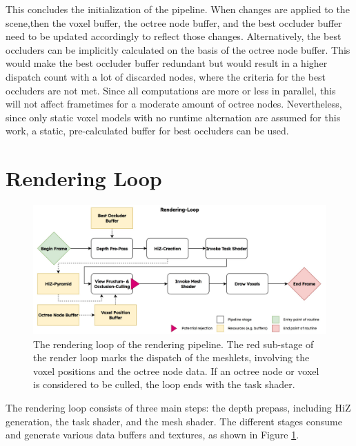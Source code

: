\clearpage

\noindent
This concludes the initialization of the pipeline. When changes are applied to the scene,then the voxel buffer,
the octree node buffer, and the best occluder buffer need to be updated accordingly to reflect those changes. 
Alternatively, the best occluders can be implicitly calculated on the basis of the octree node buffer. This 
would make the best occluder buffer redundant but would result in a higher dispatch count with a lot of discarded 
nodes, where the criteria for the best occluders are not met. Since all computations are more or less in parallel, 
this will not affect frametimes for a moderate amount of octree nodes. Nevertheless, since only static voxel models 
with no runtime alternation are assumed for this work, a static, pre-calculated buffer for best occluders can be used.


\section{Rendering Loop} \label{sec-rendering-loop}

\begin{figure}[h]
    \centering
    \includegraphics[width=\linewidth]{images/graphics/rendering-loop.jpg}
    \caption{The rendering loop of the rendering pipeline. The red sub-stage of the render loop marks the dispatch 
    of the meshlets, involving the voxel positions and the octree node data. If an octree node or voxel is considered 
    to be culled, the loop ends with the task shader.}
    \label{fig:pipeline-loop}
\end{figure}

\noindent
The rendering loop consists of three main steps: the depth prepass, including \ac{HiZ} generation, the 
task shader, and the mesh shader. The different stages consume and generate various data buffers 
and textures, as shown in Figure \ref{fig:pipeline-loop}. 

